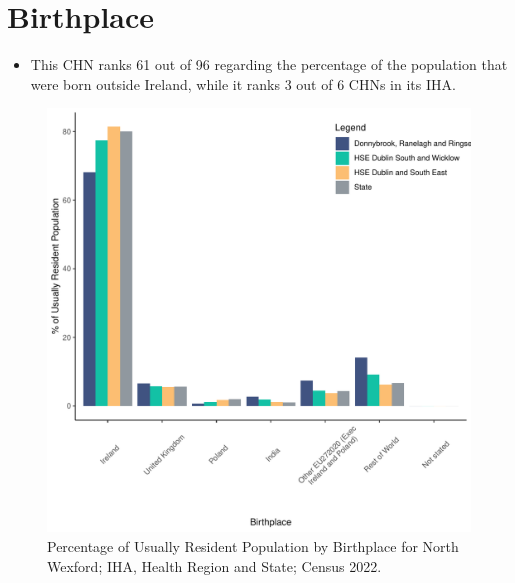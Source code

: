 \documentclass{article}
\begin{document}
\section{Birthplace}\label{sect:Birth}
\begin{itemize}
\item This CHN ranks  61 out of 96 regarding the percentage of the population that were born outside Ireland, while it ranks  3 out of 6 CHNs in its IHA.
\end{itemize}
\begin{figure}[H]
	\centering
	\includegraphics[width = 130mm]{../figures/BirthED.pdf}
	\caption{Percentage of Usually Resident Population by Birthplace for North Wexford; IHA, Health Region and State; Census 2022.}
	\label{fig:vbnv}
	\end{figure}
	
\end{document}
